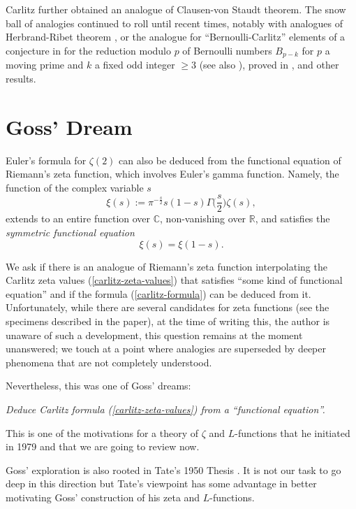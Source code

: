 \documentclass[11pt]{amsart}
\numberwithin{equation}{section}
\newcommand{\CC}{\mathbb{C}}
\newcommand{\RR}{\mathbb{R}}
\begin{document}
Carlitz further obtained an analogue of 
Clausen-von Staudt theorem. The snow ball of analogies continued to roll until recent times, notably with analogues of Herbrand-Ribet theorem \cite{TAE2,ANG&PEL&TAV}, or the analogue for ``Bernoulli-Carlitz'' elements of a conjecture in \cite{KAN} for the reduction modulo $p$ of Bernoulli numbers $B_{p-k}$ for $p$ a moving prime and $k$ a fixed odd integer $\geq 3$ (see also \cite{KAN&ZAG}), proved in \cite{ANG&NGO&TAV2}, and other results. 

\section{Goss' Dream}\label{dream}

Euler's formula for $\zeta(2)$ can also be deduced from the functional equation of Riemann's zeta function, which involves Euler's gamma function. Namely, the function of the complex variable $s$
$$\xi(s):=\pi^{-\frac{s}{2}}s(1-s)\Gamma\Big(\frac{s}{2}\Big)\zeta(s),$$
extends to an entire function over $\CC$, non-vanishing over $\RR$, and satisfies the {\em symmetric functional equation}
\begin{equation}\label{functional-equation-xi}
\xi(s)=\xi(1-s).\end{equation}
 
 We ask if  there is an analogue of Riemann's zeta function interpolating the Carlitz zeta values (\ref{carlitz-zeta-values}) that satisfies ``some kind of functional equation'' and if the formula
(\ref{carlitz-formula}) can be deduced from it. Unfortunately, while there are several candidates for zeta functions (see the specimens described in the paper), at the time of writing this, the author is unaware of such a development, this question remains at the moment unanswered; we touch at a point where analogies are superseded by deeper phenomena that are not completely understood. 

Nevertheless, this was one of Goss' dreams:

\medskip

\begin{center} {\em Deduce Carlitz formula (\ref{carlitz-zeta-values}) from a ``functional equation''.} \end{center}

\medskip

This is one of the motivations for a theory of $\zeta$ and $L$-functions that he initiated in 1979 \cite{GOS0} and that we are going to review now. 

Goss' exploration is also rooted in Tate's 1950 Thesis \cite{TAT}. It is not our task to go deep in this direction but Tate's viewpoint has some advantage in better motivating Goss' construction of his zeta and $L$-functions. 
\end{document}
